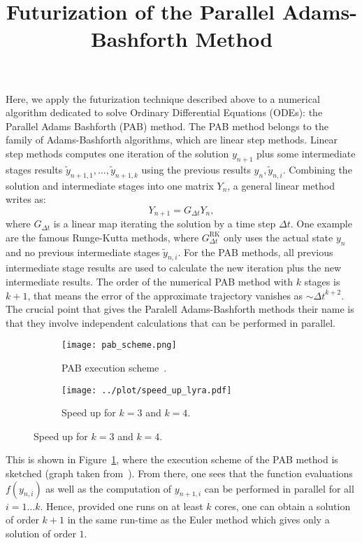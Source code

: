 \documentclass[10pt]{scrartcl}
\title{Futurization of the Parallel Adams-Bashforth Method}
\author{}
\newcommand{\Dt}{{\Delta t}}
\begin{document}
\maketitle

Here, we apply the futurization technique described above to a numerical algorithm dedicated to solve Ordinary Differential Equations (ODEs): the Parallel Adams Bashforth (PAB) method.
The PAB method belongs to the family of Adams-Bashforth algorithms, which are linear step methods.
Linear step methods computes one iteration of the solution $y_{n+1}$ plus some intermediate stages results $\tilde y_{n+1,1},\dots,\tilde y_{n+1,k}$ using the previous results $y_{n}, \tilde y_{n,i}$.
Combining the solution and intermediate stages into one matrix $Y_n$, a general linear method writes as:
\begin{equation}
 Y_{n+1} = G_\Dt Y_n,
\end{equation} 
where $G_\Dt$ is a linear map iterating the solution by a time step $\Dt$.
One example are the famous Runge-Kutta methods, where $G^\text{RK}_\Dt$ only uses the actual state $y_n$ and no previous intermediate stages $\tilde y_{n,i}$.
For the PAB methods, all previous intermediate stage results are used to calculate the new iteration plus the new intermediate results.
The order of the numerical PAB method with $k$ stages is $k+1$, that means the error of the approximate trajectory vanishes as $\sim \Dt^{k+2}$.
The crucial point that gives the Paralell Adams-Bashforth methods their name is that they involve independent calculations that can be performed in parallel.
%
\begin{figure}[t]
 \begin{subfigure}[b]{0.5\textwidth}
  \texttt{[image: pab\_scheme.png]}
  \caption{PAB execution scheme~\cite{Rauber_Ruenger}.}
  \label{fig:pab_scheme}
 \end{subfigure}
 \begin{subfigure}[b]{0.5\textwidth}
  \texttt{[image: ../plot/speed\_up\_lyra.pdf]}
  \caption{Speed up for $k=3$ and $k=4$.}
  \label{fig:speed_up}
 \end{subfigure}
\end{figure}
%
This is shown in Figure~\ref{fig:pab_scheme}, where the execution scheme of the PAB method is sketched (graph taken from~\cite{Rauber_Ruenger}).
From there, one sees that the function evaluations $f(y_{n,i})$ as well as the computation of $y_{n+1,i}$ can be performed in parallel for all $i=1\dots k$.
Hence, provided one runs on at least $k$ cores, one can obtain a solution of order $k+1$ in the same run-time as the Euler method which gives only a solution of order $1$.
\end{document}
